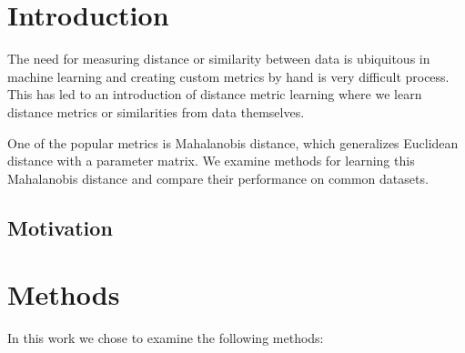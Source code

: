 \documentclass[12pt,a4paper]{report}
\begin{document}



\tableofcontents



%
%
%
%
%
%

\chapter*{Introduction}

The need for measuring distance or similarity between data is ubiquitous in machine learning and creating custom metrics by hand is very difficult process. This has led to an introduction of distance metric learning where we learn distance metrics or similarities from data themselves.

One of the popular metrics is Mahalanobis distance, which generalizes Euclidean distance with a parameter matrix. We examine methods for learning this Mahalanobis distance and compare their performance on common datasets.




\section*{Motivation}


\chapter{Methods}

In this work we chose to examine the following methods:
\end{document}
